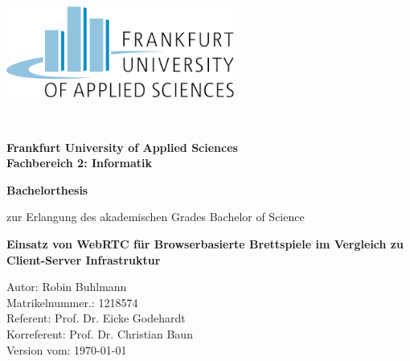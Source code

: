 \thispagestyle{empty}
\begin{center}


\includegraphics[height=3cm]{bilder/frauaslogo.png}
\begin{figure}[h!]
\centering
\end{figure}\\[1,5cm]

\begin{Large}
\textsf{\textbf{Frankfurt University of Applied Sciences}}\\
\textsf{\textbf{Fachbereich 2: Informatik}}\\[2cm]
\end{Large}


\begin{LARGE}
\textsf{\textbf{Bachelorthesis}}\\
\end{LARGE}
\textsf{zur Erlangung des akademischen Grades Bachelor of Science}\\[1cm]

\begin{Large}
\textsf{\textbf{Einsatz von WebRTC für Browserbasierte Brettspiele im Vergleich zu Client-Server Infrastruktur}}\\[3,5cm]
\end{Large}
\end{center}

\begin{large}
\textsf{Autor: Robin Buhlmann}\\[0,1cm]
\textsf{Matrikelnummer.: 1218574}\\[0,1cm]
\textsf{Referent: Prof. Dr. Eicke Godehardt}\\[0,1cm]
\textsf{Korreferent: Prof. Dr. Christian Baun}\\[0,7cm]
\textsf{Version vom: \today}
\end{large}

